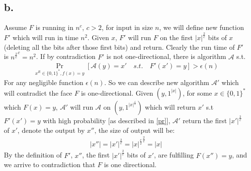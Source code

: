 \documentclass[11pt]{article}
\theoremstyle{plain}
\theoremstyle{nonumberplainnobrackets}
\begin{document}
\subsection*{b. } Assume $F$ is running in $n^c$, $c>2$, for input in size $n$, we will define new function $F'$ which will run in time $n^2$. Given $x$, $F'$ will run $F$ on the first $|x|^{\frac{2}{c}}$ bits of $x$ (deleting all the bits after those first bits) and return. Clearly the run time of $F'$ is ${n^{\frac{2}{c}}}^c = n^2$. If by contradiction $F'$ is not one-directional, there is algorithm $\mathcal{A}$ s.t. 
	\begin{align}\label{pr}
\Pr_{x^R\in\{0,1\}^*,f(x)=y} [ \mathcal{A}(y)=x' \quad s.t.\quad F'(x')=y]>\epsilon(n) 
\end{align}
For any negligible function $\epsilon(n)$. So we can describe new algorithm $\mathcal{A}'$ which will contradict the face $F$ is one-directional. Given $(y, 1^{|x|})$, for some $x\in \{0,1\}^*$ which $F(x)=y$, $\mathcal{A}'$ will run $\mathcal{A}$ on $(y,1^{|x|^{\frac{c}{2}}}) $ which will return $x'$ s.t $F'(x') = y$ with high probability [as described in \ref{pr}], $\mathcal{A}'$ return the first $|x'|^{\frac{2}{c}}$ of $x'$, denote the output by $x''$, the size of output will be:
\begin{align*}
|x''| = |x'| ^ {\frac{2}{c}} = {|x|^{\frac{c}{2}}}^{\frac{2}{c}} = |x|
\end{align*}
By the definition of $F'$, $x''$, the first $|x'|^{\frac{2}{c}}$ bits of $x'$, are fulfilling $F(x'') = y$, and we arrive to contradiction that $F$ is one directional.
\end{document}
